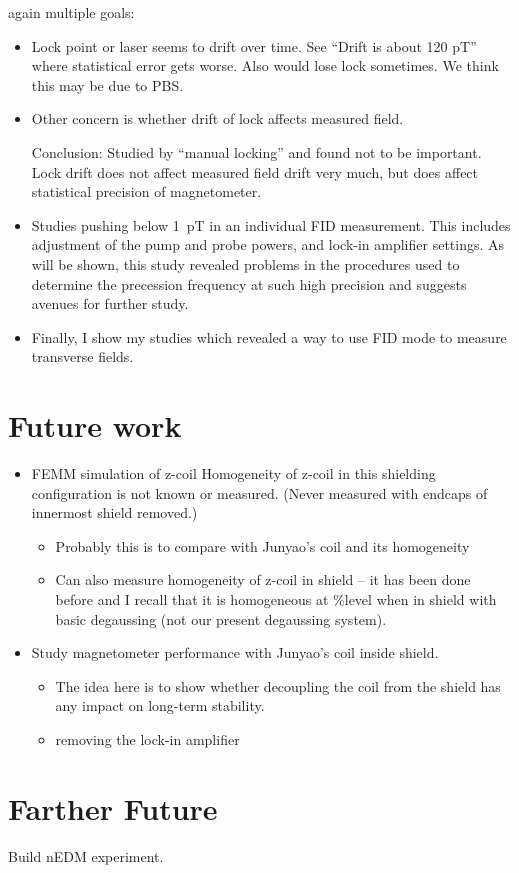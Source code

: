 again multiple goals:
 \begin{itemize}
   \item Lock point or laser seems to drift over time.  See ``Drift
    is about 120 pT'' where statistical error gets worse.  Also
     would lose lock sometimes.  We think this may be due to PBS.
    \item Other concern is whether drift of lock affects measured
     field.  
     
     Conclusion: Studied by ``manual locking'' and found not to be
     important.  Lock drift does not affect measured field drift very
    much, but does affect statistical precision of magnetometer.
\item Studies pushing below 1~pT in an individual FID measurement.
  This includes adjustment of the pump and probe powers, and lock-in
  amplifier settings.  As will be shown, this study revealed problems
  in the procedures used to determine the precession frequency at such
  high precision and suggests avenues for further study.
\item Finally, I show my studies which revealed a way to use FID mode
  to measure transverse fields.
\end{itemize}
\section{Future work}
\begin{itemize}
\item	FEMM simulation of z-coil 	Homogeneity of z-coil in this shielding configuration is not known or measured.  (Never measured with endcaps of innermost shield removed.)
\begin{itemize}
\item Probably this is to compare with Junyao’s coil and its homogeneity

\item
Can also measure homogeneity of z-coil in shield – it has been done before and I recall that it is homogeneous at $\% $level when in shield with basic degaussing (not our present degaussing system).
\end{itemize}
\item
Study magnetometer performance with Junyao's coil inside shield. 
\begin{itemize}
\item	The idea here is to show whether decoupling the coil from the shield has any impact on long-term stability.
 \item removing the lock-in amplifier
\end{itemize}
\end{itemize}

\section{Farther Future}
Build nEDM experiment.
